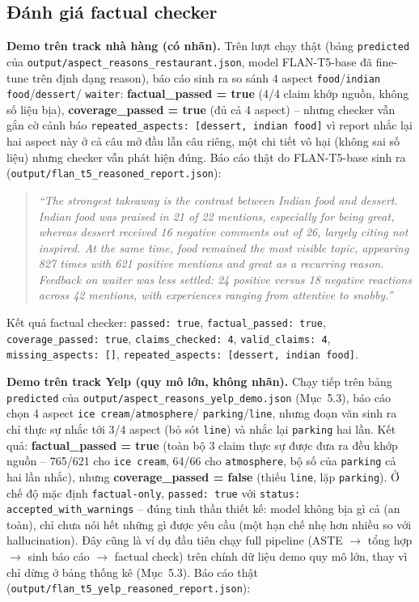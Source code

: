 \documentclass[11pt,a4paper]{article}
\begin{document}
\subsection{Đánh giá factual checker}

\textbf{Demo trên track nhà hàng (có nhãn).} Trên lượt chạy thật (bảng
\texttt{predicted} của \texttt{output/\allowbreak aspect\_\allowbreak reasons\_\allowbreak restaurant.json},
model FLAN-T5-base đã fine-tune trên định dạng reason), báo cáo sinh ra
so sánh 4 aspect \texttt{food}/\texttt{indian food}/\texttt{dessert}/
\texttt{waiter}: \textbf{factual\_passed = true} (4/4 claim khớp nguồn,
không số liệu bịa), \textbf{coverage\_passed = true} (đủ cả 4 aspect) --
nhưng checker vẫn gắn cờ cảnh báo \texttt{repeated\_aspects: [dessert,
indian food]} vì report nhắc lại hai aspect này ở cả câu mở đầu lẫn câu
riêng, một chi tiết vô hại (không sai số liệu) nhưng checker vẫn phát
hiện đúng. Báo cáo thật do FLAN-T5-base sinh ra
(\texttt{output/\allowbreak flan\_\allowbreak t5\_\allowbreak reasoned\_\allowbreak report.json}):

\begin{quote}
\emph{``The strongest takeaway is the contrast between Indian food and
dessert. Indian food was praised in 21 of 22 mentions, especially for
being great, whereas dessert received 16 negative comments out of 26,
largely citing not inspired. At the same time, food remained the most
visible topic, appearing 827 times with 621 positive mentions and great
as a recurring reason. Feedback on waiter was less settled: 24 positive
versus 18 negative reactions across 42 mentions, with experiences
ranging from attentive to snobby.''}
\end{quote}

Kết quả factual checker: \texttt{passed: true}, \texttt{factual\_passed:
true}, \texttt{coverage\_passed: true}, \texttt{claims\_checked: 4},
\texttt{valid\_claims: 4}, \texttt{missing\_aspects: []},
\texttt{repeated\_aspects: [dessert, indian food]}.

\textbf{Demo trên track Yelp (quy mô lớn, không nhãn).} Chạy tiếp trên
bảng \texttt{predicted} của \texttt{output/\allowbreak aspect\_\allowbreak reasons\_\allowbreak yelp\_\allowbreak demo.json}
(Mục~5.3), báo cáo chọn 4 aspect \texttt{ice cream}/\texttt{atmosphere}/
\texttt{parking}/\texttt{line}, nhưng đoạn văn sinh ra chỉ thực sự nhắc
tới 3/4 aspect (bỏ sót \texttt{line}) và nhắc lại \texttt{parking} hai
lần. Kết quả: \textbf{factual\_passed = true} (toàn bộ 3 claim thực sự
được đưa ra đều khớp nguồn -- 765/621 cho \texttt{ice cream}, 64/66 cho
\texttt{atmosphere}, bộ số của \texttt{parking} cả hai lần nhắc), nhưng
\textbf{coverage\_passed = false} (thiếu \texttt{line}, lặp
\texttt{parking}). Ở chế độ mặc định \texttt{factual-only},
\texttt{passed: true} với \texttt{status: accepted\_with\_warnings} --
đúng tinh thần thiết kế: model không bịa gì cả (an toàn), chỉ chưa nói
hết những gì được yêu cầu (một hạn chế nhẹ hơn nhiều so với hallucination).
Đây cũng là ví dụ đầu tiên chạy full pipeline (ASTE $\to$ tổng hợp $\to$
sinh báo cáo $\to$ factual check) trên chính dữ liệu demo quy mô lớn,
thay vì chỉ dừng ở bảng thống kê (Mục~5.3). Báo cáo thật
(\texttt{output/\allowbreak flan\_\allowbreak t5\_\allowbreak yelp\_\allowbreak reasoned\_\allowbreak report.json}):
\end{document}
